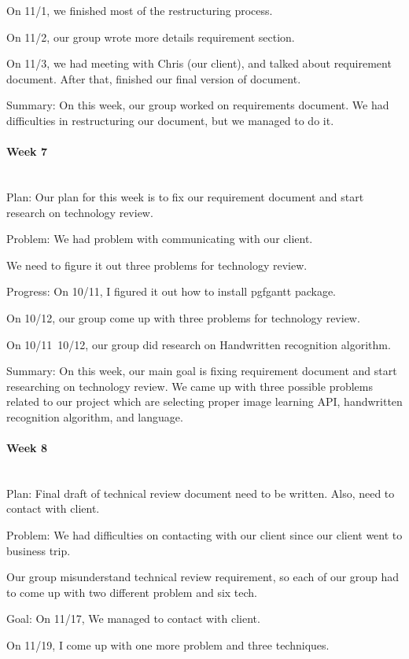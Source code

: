 \documentclass[article, onecolumn, draftclsnofoot,10pt, compsoc]{IEEEtran}
\begin{document}
On 11/1, we finished most of the restructuring process.

On 11/2, our group wrote more details requirement section.

On 11/3, we had meeting with Chris (our client), and talked about requirement document. After that, finished our final version of document.

Summary: On this week, our group worked on requirements document. We had difficulties in restructuring our document, but we managed to do it.

\paragraph{Week 7}
\mbox{}\\
Plan: Our plan for this week is to fix our requirement document and start research on technology review.

Problem: We had problem with communicating with our client.

We need to figure it out three problems for technology review.

Progress: On 10/11, I figured it out how to install pgfgantt package.

On 10/12, our group come up with three problems for technology review.

On 10/11~10/12, our group did research on Handwritten recognition algorithm.

Summary: On this week, our main goal is fixing requirement document and start researching on technology review. We came up with three possible problems related to our project which are selecting proper image learning API, handwritten recognition algorithm, and language.

\paragraph{Week 8}
\mbox{}\\
Plan: Final draft of technical review document need to be written. Also, need to contact with client.

Problem: We had difficulties on contacting with our client since our client went to business trip.

Our group misunderstand technical review requirement, so each of our group had to come up with two different problem and six tech.

Goal: On 11/17, We managed to contact with client.

On 11/19, I come up with one more problem and three techniques.
\end{document}
